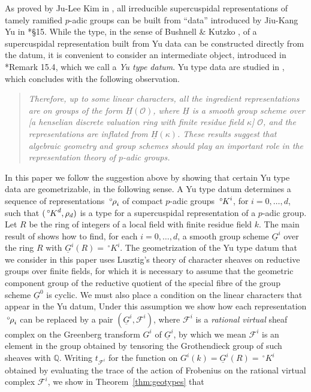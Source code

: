 \documentclass[10pt]{amsart}
\theoremstyle{plain}
\theoremstyle{definition}
\newcommand{\QQ}{{\mathbb{Q}}}
\newcommand{\trFrob}[1]{t_{#1}}
\newcommand{\cs}[1]{{\mathcal{#1}}}
\newcommand{\oK}{{\,^\circ \hskip-1pt K}}
\newcommand{\orho}{{\,^\circ \hskip-1pt \rho}}
\begin{document}
As proved by Ju-Lee Kim in \cite{kim:07a}, all irreducible supercuspidal representations of tamely ramified $p$-adic groups can be built from ``data'' introduced by Jiu-Kang Yu in \cite{yu:01a}*{\S 15}.
While the type, in the sense of Bushnell \& Kutzko \cite{bushnell-kutzko:98a}, of a supercuspidal representation built from Yu data can be constructed directly from the datum, it is convenient to consider an intermediate object, introduced in \cite{yu:01a}*{Remark 15.4}, which we call a \emph{Yu type datum}. 
Yu type data are studied in \cite{Yu:models}, which concludes with the following observation.
\begin{quotation}
{\it Therefore, up to some linear characters, all the ingredient representations 
 are on groups of the form $\underline{H}(\mathcal{O})$, where $\underline{H}$ is a smooth group scheme over [a henselian discrete valuation ring with finite residue field $\kappa$] $\mathcal{O}$, and the representations are inflated from $\underline{H}(\kappa)$. These results suggest that algebraic geometry and group schemes should play an
important role in the representation theory of $p$-adic groups.}
\end{quotation}
In this paper we follow the suggestion above by showing that certain Yu type data are geometrizable, in the following sense.
A Yu type datum determines a sequence of representations $\orho_i$ of compact $p$-adic groups $\oK^i$, for $i=0, \ldots, d$, such that $(\oK^d, \rho_d)$ is a type for a supercuspidal representation of a $p$-adic group.
Let $R$ be the ring of integers of a local field with finite residue field $k$.
The main result of \cite{Yu:models} shows how to find, for each $i=0, \ldots, d$, a smooth group scheme $\underline{G}^i$ over the ring $R$ with $\underline{G}^i(R)=\,^\circ K^i $.
The geometrization of the Yu type datum that we consider in this paper uses Lusztig's theory of character sheaves on reductive groups over finite fields, for which it is necessary to assume that the geometric component group of the reductive quotient of the special fibre of the group scheme $\underline{G}^0$ is cyclic. 
We must also place a condition on the linear characters that appear in the Yu datum, 
Under this assumption we show how each representation $\orho_i$ can be replaced by a pair $(\underline{G}^i, \cs{F}^i)$, where $\cs{F}^i$ is a {\it rational virtual} sheaf complex on the Greenberg transform $G^i$ of $\underline{G}^i$, by which we mean $\cs{F}^i$ is an element in the group obtained by tensoring the Grothendieck group of such sheaves with $\QQ$. 
Writing $\trFrob{\cs{F}^i}$ for the function on $G^i(k) = \underline{G}^i(R) = \,^\circ K^i$ obtained by evaluating the trace of the action of Frobenius on the rational virtual complex $\cs{F}^i$, we show in Theorem~\ref{thm:geotypes} that 
\end{document}
